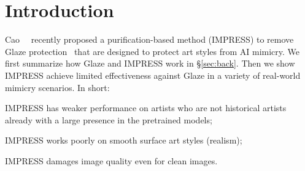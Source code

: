 \secspace
\section{Introduction}
\label{sec:intro}

Cao~\etal~\cite{cao2023impress} recently proposed a purification-based method (IMPRESS) to 
remove Glaze protection~\cite{shan2023glaze} that are designed to protect art
styles from AI mimicry. We first summarize how Glaze and IMPRESS work in \S\ref{sec:back}. 
Then we show IMPRESS achieve limited effectiveness against
Glaze in a variety of real-world mimicry scenarios. In short:

\begin{packed_itemize}
\item IMPRESS has weaker performance on artists who are not historical
  artists already with a large presence in the pretrained models;

\item IMPRESS works poorly on smooth surface art styles (\eg realism);

\item IMPRESS damages image quality even for clean images. 

\end{packed_itemize}


